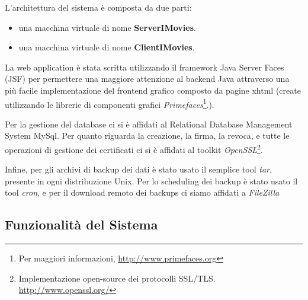 \documentclass{article}
\begin{document}
L'architettura del sistema è composta da due parti:
\begin{itemize}
\item una macchina virtuale di nome \textbf{ServerIMovies}.
\item una macchina virtuale di nome \textbf{ClientIMovies}.
\end{itemize}

La web application è stata scritta utilizzando il framework Java Server Faces (JSF) per permettere una maggiore attenzione al backend Java attraverso una più facile implementazione del frontend grafico composto da pagine xhtml (create utilizzando le librerie di componenti grafici \emph{Primefaces}\footnote{Per maggiori informazioni, \url{http://www.primefaces.org}}.).

Per la gestione del database ci si è affidati al  Relational Database Management System MySql.
Per quanto riguarda la creazione, la firma, la revoca, e tutte le operazioni di gestione dei certificati ci si è affidati al toolkit \emph{OpenSSL}\footnote{Implementazione open-source dei protocolli SSL/TLS. \url{http://www.openssl.org/}}. 

Infine, per gli archivi di backup dei dati è stato usato il semplice tool \emph{tar}, presente in ogni distribuzione Unix. Per lo scheduling dei backup è stato usato il tool \emph{cron}, e per il download remoto dei backups ci siamo affidati a \emph{FileZilla} 



\subsection{Funzionalità del Sistema}
\end{document}
